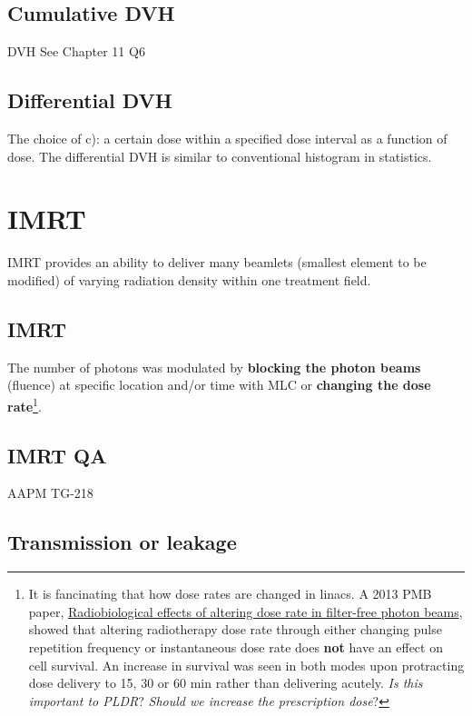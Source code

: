 \documentclass[]{book}
\let\rmarkdownfootnote\footnote%
\def\footnote{\protect\rmarkdownfootnote}
\theoremstyle{definition}
\theoremstyle{definition}
\theoremstyle{definition}
\theoremstyle{remark}
\begin{document}
\section{Cumulative DVH}\label{cumulative-dvh}

DVH See Chapter 11 Q6

\section{Differential DVH}\label{differential-dvh}

The choice of c): a certain dose within a specified dose interval as a
function of dose. The differential DVH is similar to conventional
histogram in statistics.

\chapter{IMRT}\label{imrt}

IMRT provides an ability to deliver many beamlets (smallest element to
be modified) of varying radiation density within one treatment field.

\section{IMRT}\label{imrt}

The number of photons was modulated by \textbf{blocking the photon
beams} (fluence) at specific location and/or time with MLC or
\textbf{changing the dose rate}\footnote{It is fancinating that how dose
  rates are changed in linacs. A 2013 PMB paper,
  \href{http://iopscience.iop.org/article/10.1088/0031-9155/58/4/1075/meta}{Radiobiological
  effects of altering dose rate in filter-free photon beams}, showed
  that altering radiotherapy dose rate through either changing pulse
  repetition frequency or instantaneous dose rate does \textbf{not} have
  an effect on cell survival. An increase in survival was seen in both
  modes upon protracting dose delivery to 15, 30 or 60 min rather than
  delivering acutely. \emph{Is this important to PLDR}? \emph{Should we
  increase the prescription dose}?}.

\section{IMRT QA}\label{psqa}

AAPM TG-218

\section{Transmission or leakage}\label{transmission-or-leakage}
\end{document}
